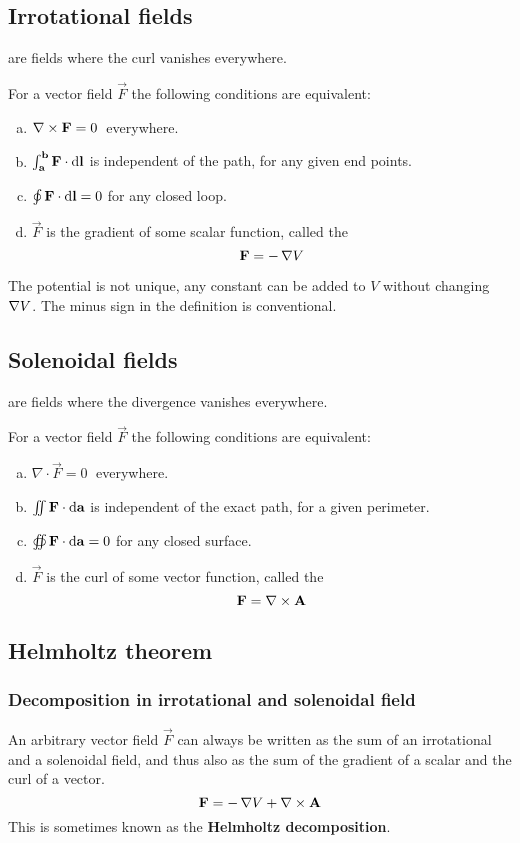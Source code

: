 \subsection{Irrotational fields}
 are fields where the curl vanishes everywhere.
\begin{eigenschap}
For a vector field $\vec{F}$ the following conditions are equivalent:
\begin{enumerate}[(a)]
\item $\mathop{}\! \nabla\times \bm{\mathrm{F}} = 0 \;$ everywhere.
\item $\int_{\bm{\mathrm{a}}}^{\bm{\mathrm{b}}}\bm{\mathrm{F}}\cdot \operatorname{d \!}{\bm{\mathrm{l}}}$ is independent of the path, for any given end points.
\item $\oint \bm{\mathrm{F}}\cdot \operatorname{d \!}{\bm{\mathrm{l}}} = 0$ for any closed loop.
\item $\vec{F}$ is the gradient of some scalar function, called the 
\[ \bm{\mathrm{F}} = - \mathop{}\! \nabla V \]
\end{enumerate}
\end{eigenschap}
The potential is not unique, any constant can be added to $V$ without changing $\mathop{}\! \nabla V$. The minus sign in the definition is conventional.
\subsection{Solenoidal fields}
 are fields where the divergence vanishes everywhere.
\begin{eigenschap}
For a vector field $\vec{F}$ the following conditions are equivalent:
\begin{enumerate}[(a)]
\item $\nabla\cdot \vec{F} = 0 \;$ everywhere.
\item $\iint \bm{\mathrm{F}}\cdot \operatorname{d \!}{\bm{\mathrm{a}}}$ is independent of the exact path, for a given perimeter.
\item $\oiint \bm{\mathrm{F}}\cdot \operatorname{d \!}{\bm{\mathrm{a}}} = 0$ for any closed surface.
\item $\vec{F}$ is the curl of some vector function, called the 
\[ \bm{\mathrm{F}} = \mathop{}\! \nabla\times \bm{\mathrm{A}} \]
\end{enumerate}
\end{eigenschap}
\subsection{Helmholtz theorem}
\subsubsection{Decomposition in irrotational and solenoidal field}
An arbitrary vector field $\vec{F}$ can always be written as the sum of an irrotational and a solenoidal field, and thus also as the sum of the gradient of a scalar and the curl of a vector.
\[ \bm{\mathrm{F}} = - \mathop{}\! \nabla V + \mathop{}\! \nabla\times \bm{\mathrm{A}} \]
This is sometimes known as the \textbf{Helmholtz decomposition}.
